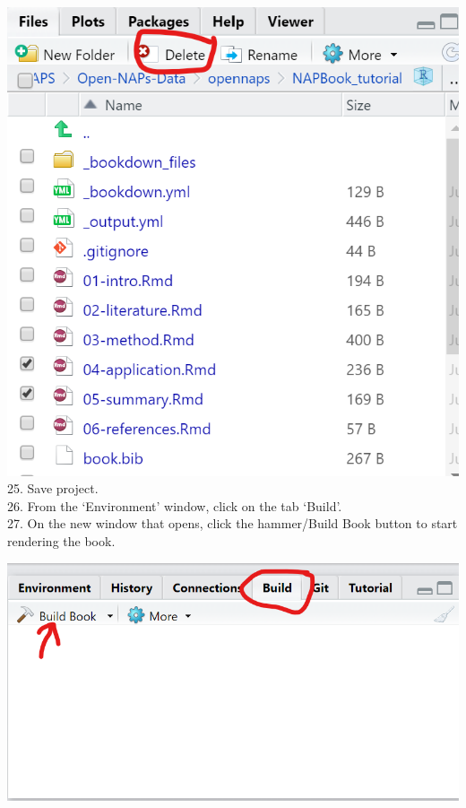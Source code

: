 \documentclass[
]{book}
\let\origfigure\figure
\let\endorigfigure\endfigure
\renewenvironment{figure}[1][2] {
    \expandafter\origfigure\expandafter[H]
} {
    \endorigfigure
}
\begin{document}
\includegraphics{tutorial_screenshots/delete_4_5.png}
25. Save project.\\
26. From the `Environment' window, click on the tab `Build'.\\
27. On the new window that opens, click the hammer/Build Book button to start rendering the book.

\begin{figure}
\centering
\includegraphics{tutorial_screenshots/build_book.png}
\caption{Build book}
\end{figure}
\end{document}
